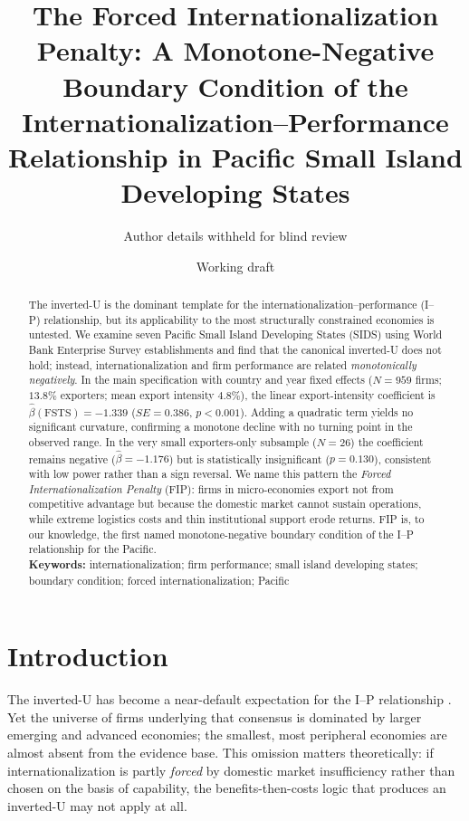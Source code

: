 \documentclass[12pt,a4paper]{article}
\title{The Forced Internationalization Penalty: A Monotone-Negative
Boundary Condition of the Internationalization--Performance Relationship in
Pacific Small Island Developing States}
\author{Author details withheld for blind review}
\date{Working draft}
\begin{document}
\maketitle

\begin{abstract}
\noindent The inverted-U is the dominant template for the
internationalization--performance (I--P) relationship, but its applicability
to the most structurally constrained economies is untested. We examine seven
Pacific Small Island Developing States (SIDS) using World Bank Enterprise
Survey establishments and find that the canonical inverted-U does not hold;
instead, internationalization and firm performance are related
\emph{monotonically negatively}. In the main specification with country and
year fixed effects ($N = 959$ firms; $13.8\%$ exporters; mean export intensity
$4.8\%$), the linear export-intensity coefficient is
$\hat{\beta}(\mathrm{FSTS}) = -1.339$ ($SE = 0.386$, $p < 0.001$). Adding a
quadratic term yields no significant curvature, confirming a monotone decline
with no turning point in the observed range. In the very small exporters-only
subsample ($N = 26$) the coefficient remains negative
($\hat{\beta} = -1.176$) but is statistically insignificant ($p = 0.130$),
consistent with low power rather than a sign reversal. We name this pattern
the \emph{Forced Internationalization Penalty} (FIP): firms in micro-economies
export not from competitive advantage but because the domestic market cannot
sustain operations, while extreme logistics costs and thin institutional
support erode returns. FIP is, to our knowledge, the first named
monotone-negative boundary condition of the I--P relationship for the Pacific.\\[4pt]
\textbf{Keywords:} internationalization; firm performance; small island
developing states; boundary condition; forced internationalization; Pacific
\end{abstract}

\section{Introduction}
The inverted-U has become a near-default expectation for the I--P
relationship \citep{lubeamish2004,contractor2012}. Yet the universe of firms
underlying that consensus is dominated by larger emerging and advanced
economies; the smallest, most peripheral economies are almost absent from the
evidence base. This omission matters theoretically: if internationalization
is partly \emph{forced} by domestic market insufficiency rather than chosen on
the basis of capability, the benefits-then-costs logic that produces an
inverted-U may not apply at all.
\end{document}

